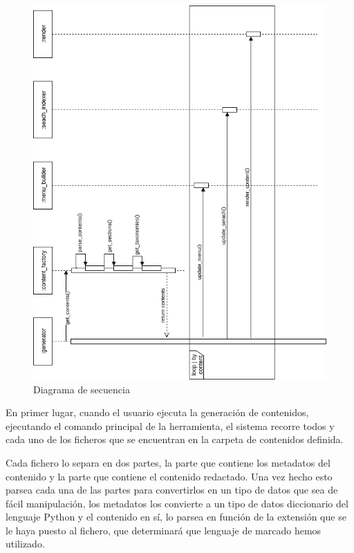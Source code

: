 \begin{figure}[htbp]
    \centering
    \includegraphics[width=1.1\textwidth]{5_diseno/diagrama_secuencia}
    \caption{Diagrama de secuencia}
    \label{fig:diagrama_secuencia}
\end{figure}

En primer lugar, cuando el usuario ejecuta la generación de contenidos, ejecutando el comando
principal de la herramienta, el sistema recorre todos y cada uno de los ficheros que se encuentran
en la carpeta de contenidos definida.

Cada fichero lo separa en dos partes, la parte que contiene los metadatos del contenido y la parte que
contiene el contenido redactado. Una vez hecho esto parsea cada una de las partes para convertirlos en
un tipo de datos que sea de fácil manipulación, los metadatos los convierte a un tipo de datos
diccionario del lenguaje Python y el contenido en sí, lo parsea en función de la extensión que se le
haya puesto al fichero, que determinará que lenguaje de marcado hemos utilizado.

